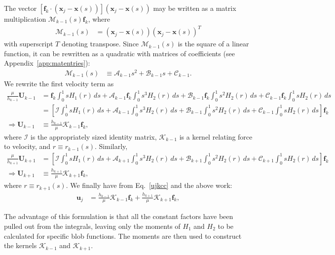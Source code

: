 \documentclass[12pt]{article}
\newcommand{\bx}{\mathbf{x}}
\newcommand{\bu}{\mathbf{u}}
\newcommand{\ff}{\mathbf{f}}
\newcommand{\bU}{\mathbf{U}}
\newcommand{\baa}[1]{\begin{align} #1 \end{align}}
\newcommand{\baas}[1]{\begin{align*} #1 \end{align*}}
\begin{document}
 	The vector $[\ff_k \cdot (\bx_j - \bx(s))](\bx_j - \bx(s))$ may be written as a matrix multiplication $\mathcal{M}_{k-1}(s)\ff_k$, where 
	\baas{
	\mathcal{M}_{k-1}(s)  & = (\bx_j - \bx(s))(\bx_j - \bx(s))^T
	} 
	with superscript $T$ denoting transpose. Since $\mathcal{M}_{k-1}(s)$ is the square of a linear function, it can be rewritten as a quadratic with matrices of coefficients (see Appendix~\ref{app:matentries}):
	\baas{
	\mathcal{M}_{k-1}(s)  & \equiv \mathcal{A}_{k-1}s^2 + \mathcal{B}_{k-1}s + \mathcal{C}_{k-1}.
	} 
	We rewrite the first velocity term as
	\baa{
	\frac{\mu}{h_{k-1}}\bU_{k-1} & = \ff_k \int_0^1 sH_1(r) \,ds + \mathcal{A}_{k-1} \ff_k \int_0^1 s^3 H_2(r) \, ds + \mathcal{B}_{k-1} \ff_k \int_0^1 s^2 H_2(r) \, ds + \mathcal{C}_{k-1} \ff_k \int_0^1 s H_2(r)\,ds \nonumber \\
	& = \left[ \mathcal{I}\int_0^1 sH_1(r) \,ds + \mathcal{A}_{k-1}\int_0^1 s^3 H_2(r) \, ds + \mathcal{B}_{k-1} \int_0^1 s^2 H_2(r) \, ds + \mathcal{C}_{k-1} \int_0^1 s H_2(r)\,ds \right]  \ff_k  \nonumber \\
	\Rightarrow \bU_{k-1} & \equiv \frac{h_{k-1}}{\mu}\mathcal{K}_{k-1} \ff_k, \label{contrib1}
	}
	where $\mathcal{I}$ is the appropriately sized identity matrix, $\mathcal{K}_{k-1}$ is a kernel relating force to velocity, and $r \equiv r_{k-1}(s)$. Similarly, 
	\baa{
	\frac{\mu}{h_{k+1}}\bU_{k+1} & = \left[ \mathcal{I}\int_0^1 sH_1(r) \,ds + \mathcal{A}_{k+1}\int_0^1 s^3 H_2(r) \, ds + \mathcal{B}_{k+1} \int_0^1 s^2 H_2(r) \, ds + \mathcal{C}_{k+1} \int_0^1 s H_2(r)\,ds \right]  \ff_k  \nonumber \\
	\Rightarrow \bU_{k+1} & \equiv \frac{h_{k+1}}{\mu}\mathcal{K}_{k+1} \ff_k, \label{contrib2}
	}
	where $r \equiv r_{k+1}(s)$. We finally have from Eq.~\eqref{ujkcc} and the above work:
	\baa{
	\bu_j & = \frac{h_{k-1}}{\mu}\mathcal{K}_{k-1} \ff_k + \frac{h_{k+1}}{\mu}\mathcal{K}_{k+1} \ff_k, \label{ujkmat}
	}
	
	The advantage of this formulation is that all the constant factors have been pulled out from the integrals, leaving only the moments of $H_1$ and $H_2$ to be calculated for specific blob functions. The moments are then used to construct the kernels $\mathcal{K}_{k-1}$ and $\mathcal{K}_{k+1}$.
	
\end{document}
